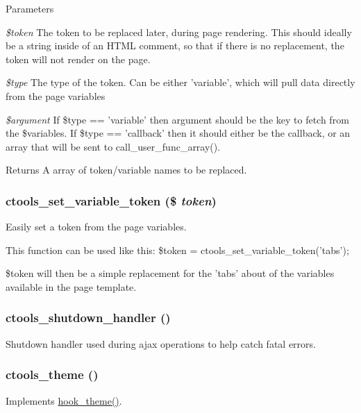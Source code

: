 \begin{DoxyParams}{Parameters}
\item[{\em \$token}]The token to be replaced later, during page rendering. This should ideally be a string inside of an HTML comment, so that if there is no replacement, the token will not render on the page. \item[{\em \$type}]The type of the token. Can be either 'variable', which will pull data directly from the page variables \item[{\em \$argument}]If \$type == 'variable' then argument should be the key to fetch from the \$variables. If \$type == 'callback' then it should either be the callback, or an array that will be sent to call\_\-user\_\-func\_\-array().\end{DoxyParams}
\begin{DoxyReturn}{Returns}
A array of token/variable names to be replaced. 
\end{DoxyReturn}
\hypertarget{ctools_8module_af50c57385ec72ff698a4292ce5b9cecd}{
\subsubsection[{ctools\_\-set\_\-variable\_\-token}]{\setlength{\rightskip}{0pt plus 5cm}ctools\_\-set\_\-variable\_\-token (\$ {\em token})}}
\label{ctools_8module_af50c57385ec72ff698a4292ce5b9cecd}
Easily set a token from the page variables.

This function can be used like this: \$token = ctools\_\-set\_\-variable\_\-token('tabs');

\$token will then be a simple replacement for the 'tabs' about of the variables available in the page template. \hypertarget{ctools_8module_aa5bb2f555630d9f5eb2b695c2e3eb68c}{
\subsubsection[{ctools\_\-shutdown\_\-handler}]{\setlength{\rightskip}{0pt plus 5cm}ctools\_\-shutdown\_\-handler ()}}
\label{ctools_8module_aa5bb2f555630d9f5eb2b695c2e3eb68c}
Shutdown handler used during ajax operations to help catch fatal errors. \hypertarget{ctools_8module_aec20ea7c40c247f48eddb4073aa2a447}{
\subsubsection[{ctools\_\-theme}]{\setlength{\rightskip}{0pt plus 5cm}ctools\_\-theme ()}}
\label{ctools_8module_aec20ea7c40c247f48eddb4073aa2a447}
Implements \hyperlink{group__hooks_ga013ccb45c7aaab1c16cf9691428c910d}{hook\_\-theme()}. 